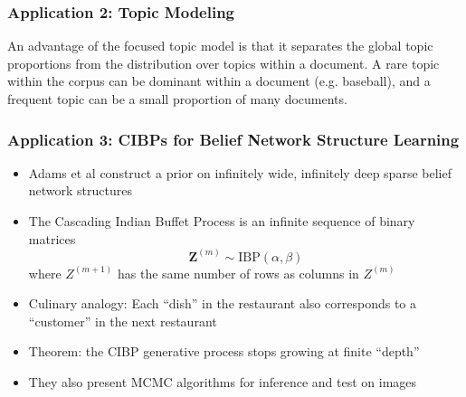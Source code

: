 \documentclass[13pt]{beamer}
\begin{document}
\begin{frame}
\frametitle{Application 2: Topic Modeling}


An advantage of the focused topic model is that it separates the global topic proportions from the distribution over topics within a document. A rare topic within the corpus can be dominant within a document (e.g. baseball), and a frequent topic can be a small proportion of many documents.

\end{frame}
\begin{frame}
\frametitle{Application 3: CIBPs for Belief Network Structure Learning}
\begin{itemize}
\item Adams et al construct a prior on infinitely wide, infinitely deep sparse belief network structures
\item The Cascading Indian Buffet Process is an infinite sequence of binary matrices $$\mathbf{Z}^{(m)} \sim \text{IBP}(\alpha,\beta)$$
    where $Z^{(m+1)}$ has the same number of rows as columns in $Z^{(m)}$
\item Culinary analogy: Each ``dish'' in the restaurant also corresponds to a ``customer'' in the next restaurant
\item Theorem: the CIBP generative process stops growing at finite ``depth''
\item They also present MCMC algorithms for inference and test on images
\end{itemize}
\end{frame}
\end{document}
